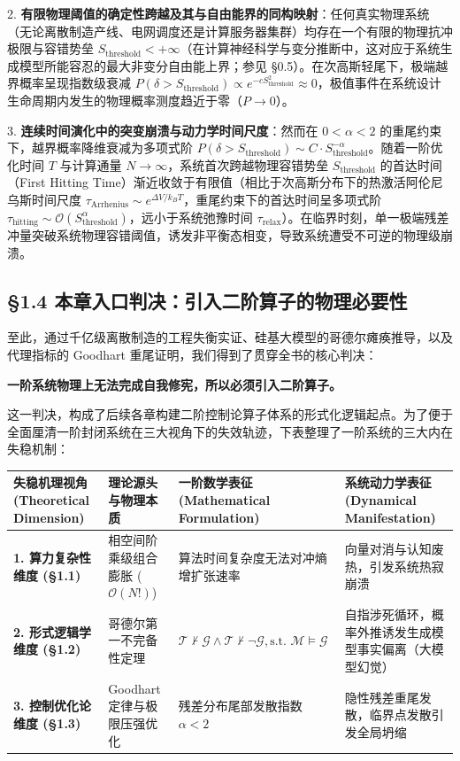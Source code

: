 \documentclass[11pt,a4paper,oneside]{ctexart}
\begin{document}
2. \textbf{有限物理阈值的确定性跨越及其与自由能界的同构映射}：任何真实物理系统（无论离散制造产线、电网调度还是计算服务器集群）均存在一个有限的物理抗冲极限与容错势垒 $S_{\text{threshold}} < +\infty$（在计算神经科学与变分推断中，这对应于系统生成模型所能容忍的最大非变分自由能上界；参见 §0.5）。在次高斯轻尾下，极端越界概率呈现指数级衰减 $P(\delta > S_{\text{threshold}}) \propto e^{-c S_{\text{threshold}}^2} \approx 0$，极值事件在系统设计生命周期内发生的物理概率测度趋近于零（$P \to 0$）。

3. \textbf{连续时间演化中的突变崩溃与动力学时间尺度}：然而在 $0 < \alpha < 2$ 的重尾约束下，越界概率降维衰减为多项式阶 $P(\delta > S_{\text{threshold}}) \sim C \cdot S_{\text{threshold}}^{-\alpha}$。随着一阶优化时间 $T$ 与计算通量 $N \to \infty$，系统首次跨越物理容错势垒 $S_{\text{threshold}}$ 的首达时间（First Hitting Time）渐近收敛于有限值（相比于次高斯分布下的热激活阿伦尼乌斯时间尺度 $\tau_{\text{Arrhenius}} \sim e^{\Delta V / k_B T}$，重尾约束下的首达时间呈多项式阶 $\tau_{\text{hitting}} \sim \mathcal{O}(S_{\text{threshold}}^\alpha)$，远小于系统弛豫时间 $\tau_{\text{relax}}$）。在临界时刻，单一极端残差冲量突破系统物理容错阈值，诱发非平衡态相变，导致系统遭受不可逆的物理级崩溃。


\subsection{§1.4 本章入口判决：引入二阶算子的物理必要性}

至此，通过千亿级离散制造的工程失衡实证、硅基大模型的哥德尔瘫痪推导，以及代理指标的 Goodhart 重尾证明，我们得到了贯穿全书的核心判决：


\begin{notebox}
\textbf{一阶系统物理上无法完成自我修宪，所以必须引入二阶算子。}
\end{notebox}

这一判决，构成了后续各章构建二阶控制论算子体系的形式化逻辑起点。为了便于全面厘清一阶封闭系统在三大视角下的失效轨迹，下表整理了一阶系统的三大内在失稳机制：


\begin{table}[htbp]
\centering
\small
\begin{tabular}{p{2.5cm}p{3.5cm}p{4.2cm}p{4.2cm}}
\toprule
失稳机理视角 (Theoretical Dimension) & 理论源头与物理本质 & 一阶数学表征 (Mathematical Formulation) & 系统动力学表征 (Dynamical Manifestation) \\
\midrule
\textbf{1. 算力复杂性维度 (§1.1)} & 相空间阶乘级组合膨胀 ($\mathcal{O}(N!)$) & 算法时间复杂度无法对冲熵增扩张速率 & 向量对消与认知废热，引发系统热寂崩溃 \\
\textbf{2. 形式逻辑学维度 (§1.2)} & 哥德尔第一不完备性定理 & $\mathcal{T} \nvdash \mathcal{G} \land \mathcal{T} \nvdash \neg \mathcal{G}, \text{s.t. } \mathcal{M} \models \mathcal{G}$ & 自指涉死循环，概率外推诱发生成模型事实偏离（大模型幻觉） \\
\textbf{3. 控制优化论维度 (§1.3)} & Goodhart 定律与极限压强优化 & 残差分布尾部发散指数 $\alpha < 2$ & 隐性残差重尾发散，临界点发散引发全局坍缩 \\
\bottomrule
\end{tabular}
\end{table}
\end{document}
